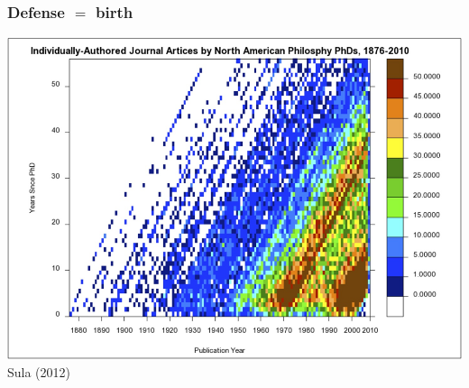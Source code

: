 \documentclass[20pt]{beamer}
\begin{document}
\begin{frame}
\frametitle{Defense $=$ birth}
\includegraphics[scale=1.3]{Figures/LexisArticles.png}\\
Sula (2012)
\end{frame}

%
%
%
\end{document}
